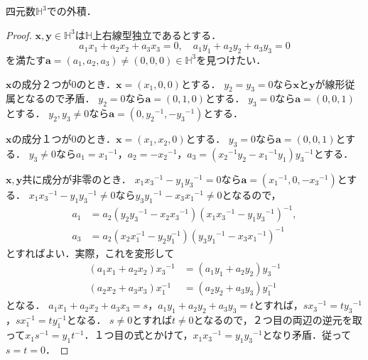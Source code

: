 \documentclass[a4paper, leqno]{ltjsreport}
\begin{document}
\begin{screen}
  四元数$\mathbb{H}^3$での外積．
\end{screen}
\begin{proof}
  $\boldsymbol{x}, \boldsymbol{y} \in \mathbb{H}^3$は$\mathbb{H}$上右線型独立であるとする．
  \[a_1x_1 + a_2x_2 + a_3x_3 = 0,\quad a_1y_1 + a_2y_2 + a_3y_3 = 0\]
  を満たす$\boldsymbol{a} = (a_1, a_2, a_3) \neq (0, 0, 0) \in \mathbb{H}^3$を見つけたい．

  $\boldsymbol{x}$の成分２つが$0$のとき．$\boldsymbol{x}=(x_1, 0, 0)$とする．
  $y_2=y_3=0$なら$\boldsymbol{x}$と$\boldsymbol{y}$が線形従属となるので矛盾．
  $y_2=0$なら$\boldsymbol{a} = (0, 1, 0)$とする．
  $y_3=0$なら$\boldsymbol{a} = (0, 0, 1)$とする．
  $y_2, y_3 \neq 0$なら$\boldsymbol{a} = (0, y_2{}^{-1}, -y_3{}^{-1})$とする．

  $\boldsymbol{x}$の成分１つが$0$のとき．$\boldsymbol{x} = (x_1, x_2, 0)$とする．
  $y_3 = 0$なら$\boldsymbol{a} = (0, 0, 1)$とする．
  $y_3 \neq 0$なら$a_1 = x_1{}^{-1}$，$a_2 = -x_2{}^{-1}$，$a_3 = (x_2{}^{-1} y_2 - x_1{}^{-1} y_1) y_3{}^{-1}$とする．

  $\boldsymbol{x}, \boldsymbol{y}$共に成分が非零のとき．
  $x_1 x_3{}^{-1} - y_1 y_3{}^{-1} = 0$なら$\boldsymbol{a} = (x_1{}^{-1}, 0, -x_3{}^{-1})$とする．
  $x_1 x_3{}^{-1} - y_1 y_3{}^{-1} \neq 0$なら$y_3 y_1{}^{-1} - x_3 x_1{}^{-1} \neq 0$となるので，
  \begin{align*}
    a_1 &= a_2 (y_2 {y_3}^{-1} - x_2 {x_3}^{-1}) (x_1 x_3{}^{-1} - y_1 y_3{}^{-1})^{-1},\\
    a_3 &= a_2 (x_2 {x}_1^{-1} - y_2 {y}_1^{-1}) (y_3 y_1{}^{-1} - x_3 x_1{}^{-1})^{-1}
  \end{align*}
  とすればよい．実際，これを変形して
  \begin{align*}
    (a_1x_1 + a_2x_2){x_3}^{-1} &= (a_1y_1 + a_2y_2){y_3}^{-1} \\
    (a_2x_2 + a_3x_3){x}_1^{-1} &= (a_2y_2 + a_3y_3){y}_1^{-1}
  \end{align*}
  となる．
  $a_1x_1 + a_2x_2 + a_3x_3 = s$，$a_1y_1 + a_2y_2 + a_3y_3 = t$とすれば，$s{x_3}^{-1} = t{y_3}^{-1}$，$s{x}_1^{-1} = t{y}_1^{-1}$となる．
  $s \neq 0$とすれば$t \neq 0$となるので，２つ目の両辺の逆元を取って$x_1s^{-1} = y_1t^{-1}$．１つ目の式とかけて，$x_1{x_3}^{-1} = y_1{y_3}^{-1}$となり矛盾．従って$s=t=0$．
\end{proof}
\end{document}
